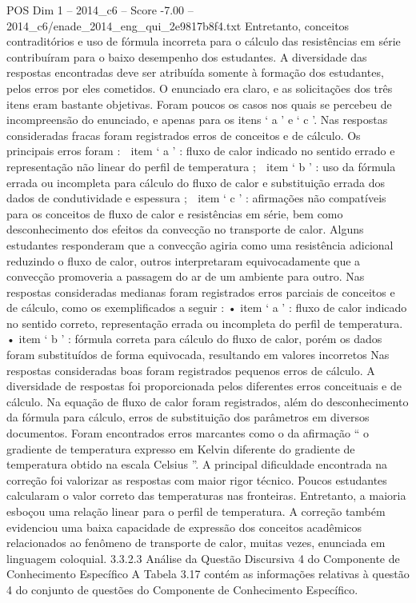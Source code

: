 \begin{textsample}{POS Dim 1 – 2014\_c6 – Score -7.00 – 2014\_c6/enade\_2014\_eng\_qui\_2e9817b8f4.txt}
Entretanto, conceitos contraditórios e uso de fórmula incorreta para o cálculo das resistências em série contribuíram para o baixo desempenho dos estudantes.
A diversidade das respostas encontradas deve ser atribuída somente à formação dos estudantes, pelos erros por eles cometidos.
O enunciado era claro, e as solicitações dos três itens eram bastante objetivas.
Foram poucos os casos nos quais se percebeu de incompreensão do enunciado, e apenas para os itens ‘ a ’ e ‘ c ’.
Nas respostas consideradas fracas foram registrados erros de conceitos e de cálculo.
Os principais erros foram :  item ‘ a ’ : fluxo de calor indicado no sentido errado e representação não linear do perfil de temperatura ;  item ‘ b ’ : uso da fórmula errada ou incompleta para cálculo do fluxo de calor e substituição errada dos dados de condutividade e espessura ;  item ‘ c ’ : afirmações não compatíveis para os conceitos de fluxo de calor e resistências em série, bem como desconhecimento dos efeitos da convecção no transporte de calor.
Alguns estudantes responderam que a convecção agiria como uma resistência adicional reduzindo o fluxo de calor, outros interpretaram equivocadamente que a convecção promoveria a passagem do ar de um ambiente para outro.
Nas respostas consideradas medianas foram registrados erros parciais de conceitos e de cálculo, como os exemplificados a seguir : • item ‘ a ’ : fluxo de calor indicado no sentido correto, representação errada ou incompleta do perfil de temperatura. • item ‘ b ’ : fórmula correta para cálculo do fluxo de calor, porém os dados foram substituídos de forma equivocada, resultando em valores incorretos Nas respostas consideradas boas foram registrados pequenos erros de cálculo.
A diversidade de respostas foi proporcionada pelos diferentes erros conceituais e de cálculo.
Na equação de fluxo de calor foram registrados, além do desconhecimento da fórmula para cálculo, erros de substituição dos parâmetros em diversos documentos.
Foram encontrados erros marcantes como o da afirmação “ o gradiente de temperatura expresso em Kelvin diferente do gradiente de temperatura obtido na escala Celsius ”.
A principal dificuldade encontrada na correção foi valorizar as respostas com maior rigor técnico.
Poucos estudantes calcularam o valor correto das temperaturas nas fronteiras.
Entretanto, a maioria esboçou uma relação linear para o perfil de temperatura.
A correção também evidenciou uma baixa capacidade de expressão dos conceitos acadêmicos relacionados ao fenômeno de transporte de calor, muitas vezes, enunciada em linguagem coloquial. 3.3.2.3 Análise da Questão Discursiva 4 do Componente de Conhecimento Específico A Tabela 3.17 contém as informações relativas à questão 4 do conjunto de questões do Componente de Conhecimento Específico.

\end{textsample}
